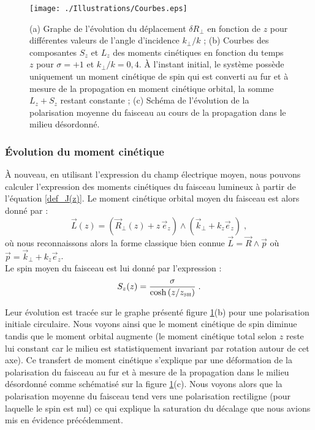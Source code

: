 \documentclass[a4paper,11pt]{article} %
\begin{document}
	
	\begin{figure}[h]
		\centering
		\begin{minipage}[c]{0.85\linewidth}
			\centering
			\texttt{[image: ./Illustrations/Courbes.eps]}
			\caption{(a) Graphe de l'évolution du déplacement $ \delta R_\perp $ en fonction de $ z $ pour différentes valeurs de l'angle d'incidence $k_\perp/k $ ; (b) Courbes des composantes $ S_z $ et $ L_z $ des moments cinétiques en fonction du temps $ z $ pour $ \sigma = + 1 $ et $ k_\perp / k = 0,4 $. \`{A} l'instant initial, le système possède uniquement un moment cinétique de spin qui est converti au fur et à mesure de la propagation en moment cinétique orbital, la somme $ L_z + S_z $ restant constante ; (c) Schéma de l'évolution de la polarisation moyenne du faisceau au cours de la propagation dans le milieu désordonné.}
			\label{fig:Plot}
		\end{minipage}
	\end{figure}
	
	\subsubsection{\'Evolution du moment cinétique}
	\`A nouveau, en utilisant l'expression du champ électrique moyen, nous pouvons calculer l'expression des moments cinétiques du faisceau lumineux à partir de l'équation \eqref{def_J(z)}. Le moment cinétique orbital moyen du faisceau est alors donné par :
	\begin{equation*}
		\label{exp_L(z)}
		\vec{L}(z) = \left(\vec{R}_\perp(z) + z \, \vec{e}_z \right) \wedge \left( \vec{k}_\perp + k_z \vec{e}_z \right) \; ,
	\end{equation*}
	où nous reconnaissons alors la forme classique bien connue $ \vec{L} = \vec{R} \wedge \vec{p} $ où $ \vec{p} = \vec{k}_\perp + k_z \vec{e}_z $.\\
	
	Le spin moyen du faisceau est lui donné par l'expression :
	\begin{equation}
		\label{exp_S(z)}
		S_z(z) =  \frac{ \sigma}{ \cosh \left( z/z_\text{{\tiny SH}} \right) } \; .
	\end{equation}
	
	Leur évolution est tracée sur le graphe présenté figure \ref{fig:Plot}(b) pour une polarisation initiale circulaire. Nous voyons ainsi que le moment cinétique de spin diminue tandis que le moment orbital augmente (le moment cinétique total selon $ z $ reste lui constant car le milieu est statistiquement invariant par rotation autour de cet axe). Ce transfert de moment cinétique s'explique par une déformation de la polarisation du faisceau au fur et à mesure de la propagation dans le milieu désordonné comme schématisé sur la figure \ref{fig:Plot}(c). Nous voyons alors que la polarisation moyenne du faisceau tend vers une polarisation rectiligne (pour laquelle le spin est nul) ce qui explique la saturation du décalage que nous avions mis en évidence précédemment.
	
\end{document}
